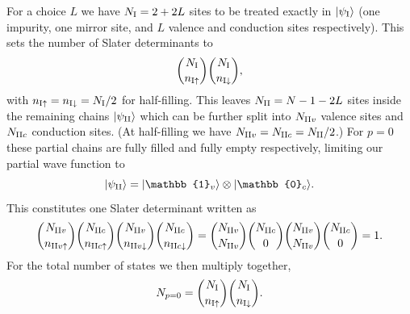 For a choice $L$ we have $N_{\mathrm{I}} = 2+2L$ sites to be treated exactly
in $\lvert\psi_{\mathrm{I}}\rangle$
(one impurity, one mirror site, and $L$ valence and conduction sites respectively).
This sets the number of Slater determinants to
\begin{equation}
    \binom{N_{\mathrm{I}}}{n_{\mathrm{I}\uparrow}}
    \binom{N_{\mathrm{I}}}{n_{\mathrm{I}\downarrow}},
    \label{eq:dets-I-p0}
\end{equation}
with $n_{\mathrm{I}\uparrow} = n_{\mathrm{I}\downarrow} = N_{\mathrm{I}}/2$ for half-filling.
This leaves $N_{\mathrm{II}} = N-1-2L$ sites inside the remaining chains $\lvert\psi_{\mathrm{II}}\rangle$
which can be further split into $N_{\mathrm{II} v}$ valence sites and $N_{\mathrm{II} c}$ conduction sites.
(At half-filling we have $N_{\mathrm{II} v} = N_{\mathrm{II} c} = N_{\mathrm{II}}/2$.)
For $p=0$ these partial chains are fully filled and fully empty respectively,
limiting our partial wave function to
\begin{equation*}
    \ket{\psi_\mII} = \ket{\mathbb{1}_v} \otimes \ket{\mathbb{0}_c}.
\end{equation*}
This constitutes one Slater determinant written as
\begin{equation}
    \binom{N_{\mathrm{II} v}}{n_{\mathrm{II} v\uparrow}}
    \binom{N_{\mathrm{II} c}}{n_{\mathrm{II} c\uparrow}}
    \binom{N_{\mathrm{II} v}}{n_{\mathrm{II} v\downarrow}}
    \binom{N_{\mathrm{II} c}}{n_{\mathrm{II} c\downarrow}}
    =
    \binom{N_{\mathrm{II} v}}{N_{\mathrm{II} v}}
    \binom{N_{\mathrm{II} c}}{0}
    \binom{N_{\mathrm{II} v}}{N_{\mathrm{II} v}}
    \binom{N_{\mathrm{II} c}}{0}
    =
    1.
    \label{eq:dets-II-p0}
\end{equation}
For the total number of states we then multiply  together,
\begin{equation}
    N_{p=0}
    =
    \binom{N_{\mathrm{I}}}{n_{\mathrm{I}\uparrow}}
    \binom{N_{\mathrm{I}}}{n_{\mathrm{I}\downarrow}}.
\end{equation}

